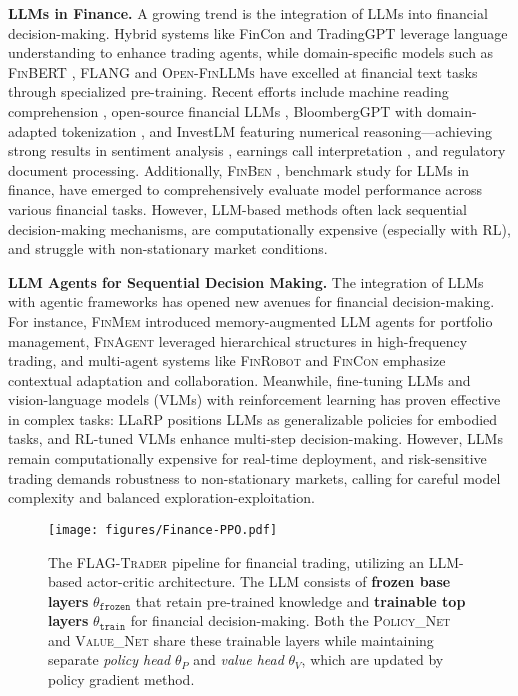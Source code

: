 \textbf{LLMs in Finance.}
A growing trend is the integration of LLMs into financial decision-making. Hybrid systems like FinCon \cite{yu2025fincon} and TradingGPT \cite{li2023tradinggpt} leverage language understanding to enhance trading agents, while domain-specific models such as \textsc{FinBERT} \cite{araci2019finbert,yang2020finbert}, \textsc{FLANG} \cite{shah2022flue} and \textsc{Open-FinLLMs} \cite{xie2024open} have excelled at financial text tasks through specialized pre-training. Recent efforts include machine reading comprehension \cite{zhang2023finbert}, open-source financial LLMs \cite{liu2023fingpt}, BloombergGPT with domain-adapted tokenization \cite{wu2023bloomberggpt}, and InvestLM \cite{yang2023investlm} featuring numerical reasoning—achieving strong results in sentiment analysis \cite{huang2023finbert}, earnings call interpretation \cite{xie2023pixiu}, and regulatory document processing. Additionally, \textsc{FinBen} \cite{xie2024finben}, benchmark study for LLMs in finance, have emerged to comprehensively evaluate model performance across various financial tasks. However, LLM-based methods often lack sequential decision-making mechanisms, are computationally expensive (especially with RL), and struggle with non-stationary market conditions.

\textbf{LLM Agents for Sequential Decision Making.}
The integration of LLMs with agentic frameworks has opened new avenues for financial decision-making. For instance, \textsc{FinMem} \cite{yu2024finmem} introduced memory-augmented LLM agents for portfolio management, \textsc{FinAgent} \cite{zhang2024finagent} leveraged hierarchical structures in high-frequency trading, and multi-agent systems like \textsc{FinRobot} \cite{yang2024finrobot} and \textsc{FinCon} \cite{yu2024fincon} emphasize contextual adaptation and collaboration. Meanwhile, fine-tuning LLMs and vision-language models (VLMs) with reinforcement learning has proven effective in complex tasks: LLaRP \cite{szot2023large} positions LLMs as generalizable policies for embodied tasks, and RL-tuned VLMs \cite{zhai2024fine} enhance multi-step decision-making.
However, LLMs remain computationally expensive for real-time deployment, and risk-sensitive trading demands robustness to non-stationary markets, calling for careful model complexity and balanced exploration-exploitation.

 \begin{figure*}
     \centering
     \texttt{[image: figures/Finance-PPO.pdf]}
     \caption{The \textsc{FLAG-Trader} pipeline for financial trading, utilizing an LLM-based actor-critic architecture.  The LLM consists of \textbf{frozen base layers} $\theta_{\texttt{frozen}}$ that retain pre-trained knowledge and \textbf{trainable top layers} $\theta_{\texttt{train}}$ for financial decision-making. Both the \textsc{Policy\_Net}  and \textsc{Value\_Net}  share these trainable layers while maintaining separate \textit{policy head} $\theta_P$ and \textit{value head} $\theta_V$, which are updated by policy gradient method.}
     \label{fig:AC-network}
 \end{figure*}